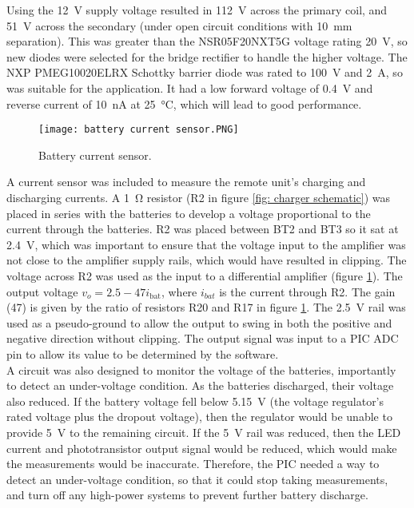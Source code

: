 Using the \SI{12}{\volt} supply voltage resulted in \SI{112}{\volt} across the primary coil, and \SI{51}{\volt} across the secondary (under open circuit conditions with \SI{10}{\milli\metre} separation). This was greater than the NSR05F20NXT5G voltage rating \SI{20}{\volt}, so new diodes were selected for the bridge rectifier to handle the higher voltage. The NXP PMEG10020ELRX Schottky barrier diode \cite{new_diode} was rated to \SI{100}{\volt} and \SI{2}{\ampere}, so was suitable for the application. It had a low forward voltage of \SI{0.4}{\volt} and reverse current of \SI{10}{\nano\ampere} at \SI{25}{\celsius}, which will lead to good performance.\\




\begin{figure}[htb]
	\centering
	\texttt{[image: battery current sensor.PNG]}
	\caption{Battery current sensor.}
	\label{fig: battery current sensor}
\end{figure}

A current sensor was included to measure the remote unit's charging and discharging currents. A \SI{1}{\ohm} resistor (R2 in figure \ref{fig: charger schematic}) was placed in series with the batteries to develop a voltage proportional to the current through the batteries. R2 was placed between BT2 and BT3 so it sat at \SI{2.4}{\volt}, which was important to ensure that the voltage input to the amplifier was not close to the amplifier supply rails, which would have resulted in clipping. The voltage across R2 was used as the input to a differential amplifier (figure \ref{fig: battery current sensor}). The output voltage $v_o = 2.5 - 47 i_\text{bat}$, where $i_{bat}$ is the current through R2. The gain (47) is given by the ratio of resistors R20 and R17 in figure \ref{fig: battery current sensor}. The \SI{2.5}{\volt} rail was used as a pseudo-ground to allow the output to swing in both the positive and negative direction without clipping. The output signal was input to a PIC ADC pin to allow its value to be determined by the software.\\



A circuit was also designed to monitor the voltage of the batteries, importantly to detect an under-voltage condition. As the batteries discharged, their voltage also reduced. If the battery voltage fell below \SI{5.15}{\volt} (the voltage regulator's rated voltage plus the dropout voltage), then the regulator would be unable to provide \SI{5}{\volt} to the remaining circuit. If the \SI{5}{\volt} rail was reduced, then the LED current and phototransistor output signal would be reduced, which would make the measurements would be inaccurate. Therefore, the PIC needed a way to detect an under-voltage condition, so that it could stop taking measurements, and turn off any high-power systems to prevent further battery discharge.\\

